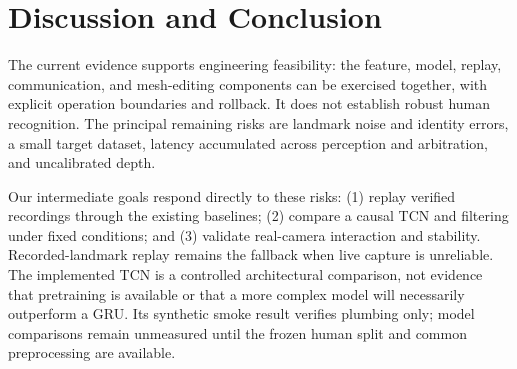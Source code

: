 \documentclass{article}
\newif\ifdraftnotes
\newcommand{\workitem}[7]{%
  \ifdraftnotes
  \begin{tcolorbox}[title={#1},title after break={#1 (continued)}]
  \textbf{Owner: }#2\par
  \textbf{Task: }#3\par
  \textbf{Protocol: }#4\par
  \textbf{Deliverables: }#5\par
  \textbf{Fill here: }#6\par
  \textbf{Done when: }#7
  \end{tcolorbox}
  \fi}
\newcommand{\code}[1]{\texttt{\detokenize{#1}}}
\begin{document}
\workitem{A1 | Change one factor at a time in ablations}
{D (name to be assigned); A helps with statistics and E checks interaction consequences.}
{Primary experiment: fix rules and the full controller, then compare None/EMA/Kalman. Additional offline experiment: fix rules and EMA, compare \code{combo_ms=200} with \code{combo_ms=0}, and retain all other mechanisms.}
{Each person additionally records at least two 10-second stationary intervals and ten fast-motion/release actions, using the existing subject split. Use normalized 2D index-fingertip coordinates; compute RMS per stationary interval, then report aggregates and valid-frame rates. Tune Q/R on validation data, never on the test person. Do not interpolate missing detections into valid hands; keep inputs and labels fixed. Evaluate arbitration changes offline only and retain hand-loss rollback in human sessions.}
{Raw values, parameters, and scripts for Table~\ref{tab:ablation}; one time-aligned None/EMA/Kalman trajectory plot. Save wrong modes, false operations, misses, and delays for the arbitration comparison separately.}
{Quantify jitter reduction and response delay. Check whether fewer false operations merely reflect more misses. Present arbitration findings in a separate small table or paragraph, not in the filter table. Retain planned status if no results are available.}
{Thursday, Oct. 22: every claim traces to a same-input comparison. Do not report millimeters without calibration or treat a smoothed trajectory as ground truth.}

\section{Discussion and Conclusion}\label{sec:discussion}
The current evidence supports engineering feasibility: the feature, model, replay,
communication, and mesh-editing components can be exercised together, with explicit
operation boundaries and rollback. It does not establish robust human recognition.
The principal remaining risks are landmark noise and identity errors, a small target
dataset, latency accumulated across perception and arbitration, and uncalibrated depth.

Our intermediate goals respond directly to these risks: (1) replay verified recordings
through the existing baselines; (2) compare a causal TCN and filtering under fixed
conditions; and (3) validate real-camera interaction and stability. Recorded-landmark
replay remains the fallback when live capture is unreliable. The implemented TCN is
a controlled architectural comparison, not evidence that pretraining is available
or that a more complex model will necessarily outperform a GRU. Its synthetic smoke
result verifies plumbing only; model comparisons remain unmeasured until the frozen
human split and common preprocessing are available.
\end{document}
